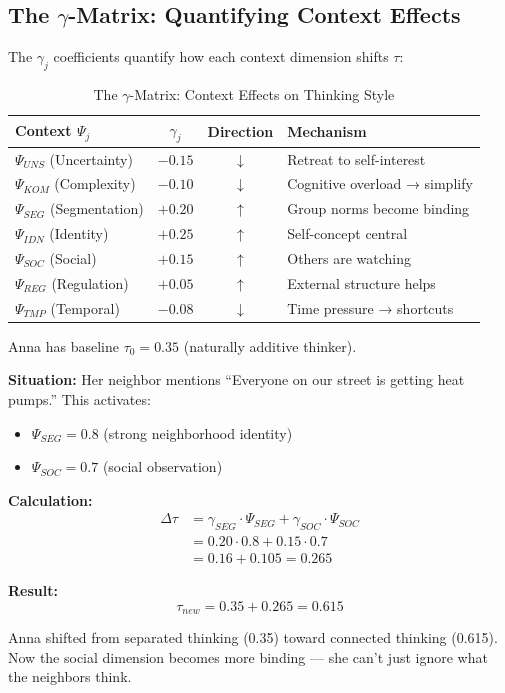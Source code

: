 \subsection{The $\gamma$-Matrix: Quantifying Context Effects}
\label{subsec:12-2-gamma-matrix}

The $\gamma_j$ coefficients quantify how each context dimension shifts $\tau$:

\begin{table}[htbp]
\centering
\caption{The $\gamma$-Matrix: Context Effects on Thinking Style}
\label{tab:gamma-matrix}
\begin{tabular}{lccl}
\toprule
\textbf{Context $\Psi_j$} & \textbf{$\gamma_j$} & \textbf{Direction} & \textbf{Mechanism}\\
\midrule
$\Psi_{UNS}$ (Uncertainty) & $-0.15$ & $\downarrow$ & Retreat to self-interest\\
$\Psi_{KOM}$ (Complexity) & $-0.10$ & $\downarrow$ & Cognitive overload → simplify\\
$\Psi_{SEG}$ (Segmentation) & $+0.20$ & $\uparrow$ & Group norms become binding\\
$\Psi_{IDN}$ (Identity) & $+0.25$ & $\uparrow$ & Self-concept central\\
$\Psi_{SOC}$ (Social) & $+0.15$ & $\uparrow$ & Others are watching\\
$\Psi_{REG}$ (Regulation) & $+0.05$ & $\uparrow$ & External structure helps\\
$\Psi_{TMP}$ (Temporal) & $-0.08$ & $\downarrow$ & Time pressure → shortcuts\\
\bottomrule
\end{tabular}
\end{table}

\begin{example}
Anna has baseline $\tau_0 = 0.35$ (naturally additive thinker).

\textbf{Situation:} Her neighbor mentions ``Everyone on our street is getting 
heat pumps.'' This activates:
\begin{itemize}
\item $\Psi_{SEG} = 0.8$ (strong neighborhood identity)
\item $\Psi_{SOC} = 0.7$ (social observation)
\end{itemize}

\textbf{Calculation:}
\begin{align*}
\Delta\tau &= \gamma_{SEG} \cdot \Psi_{SEG} + \gamma_{SOC} \cdot \Psi_{SOC}\\
&= 0.20 \cdot 0.8 + 0.15 \cdot 0.7\\
&= 0.16 + 0.105 = 0.265
\end{align*}

\textbf{Result:}
\begin{equation*}
\tau_{new} = 0.35 + 0.265 = \mathbf{0.615}
\end{equation*}

Anna shifted from separated thinking (0.35) toward connected thinking (0.615). 
Now the social dimension becomes more binding — she can't just ignore what 
the neighbors think.
\end{example}


